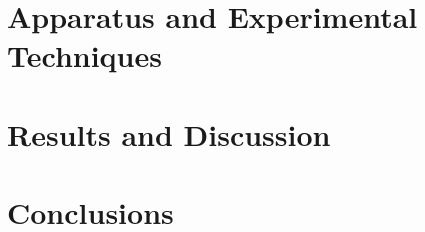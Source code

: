 \documentclass[12pt]{article}
\begin{document}
\section{Apparatus and Experimental Techniques}

\newpage



%
%

\section{Results and Discussion}

\newpage



%
%

\section{Conclusions}

\newpage



\noindent

\markboth{}{}
\printbibliography
\markboth{}{}

\begin{appendix}
\end{appendix}
\end{document}
